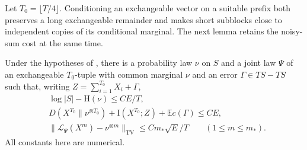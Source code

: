 Let $T_0=\lfloor T/4\rfloor$.  Conditioning an exchangeable vector on a
suitable prefix both preserves a long exchangeable remainder and makes
short subblocks close to independent copies of its conditional marginal.
The next lemma retains the noisy-sum cost at the same time.

\begin{lemma}
\label{entropy-foundations:exchangeable}
Under the hypotheses of , there is a probability
law $\nu$ on $S$ and a joint law $\Psi$ of an
exchangeable $T_0$-tuple with common marginal $\nu$ and an error
$\Gamma\in TS-TS$ such that, writing $Z=\sum_{i=1}^{T_0}X_i+\Gamma$,
\begin{equation}
\label{eq:source-2}
\begin{split}
 &\log|S|-\mathrm H(\nu)\le CE/T,\\
 &D(X^{T_0}\|\nu^{\otimes T_0})
       +\mathrm I(X^{T_0};Z)+\mathbb E c(\Gamma)\le CE,\\
 &\|\mathcal L_\Psi(X^m)-\nu^{\otimes m}\|_{\mathrm{TV}}
       \le C m_*\sqrt E/T\qquad(1\le m\le m_*).
\end{split}
\end{equation}
All constants here are numerical.
\end{lemma}

